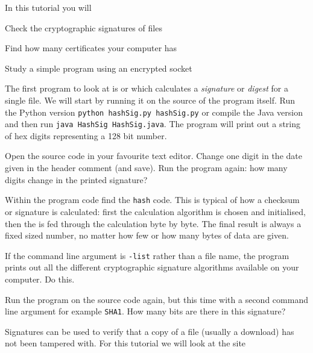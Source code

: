 









In this tutorial you will

\DOT Check the cryptographic signatures of files

\DOT Find how many certificates your computer has

\DOT Study a simple program using an encrypted socket



\STEP The first program to look at is  or 
which calculates a \emph{signature} or \emph{digest} for a single file. We
will start by running it on the source of the program itself. Run the Python
version \texttt{python hashSig.py hashSig.py} or compile the Java version and
then run \texttt{java HashSig HashSig.java}. The program will print out a
string of hex digits representing a 128 bit number.

Open the source code in your favourite text editor. Change one digit in the
 date given in the header comment (and save). Run the program again:
how many digits change in the printed signature?

Within the program code find the \texttt{hash} code. This is typical of how a
checksum or signature is calculated: first the calculation algorithm is chosen and
initialised, then the  is fed through the calculation byte by byte.
The final result is always a fixed sized number, no matter how few or how
many bytes of data are given.

\STEP If the command line argument is \texttt{-list} rather than a file name,
the program prints out all the different cryptographic signature algorithms
available on your computer. Do this.

Run the program on the source code again, but this time with a second command
line argument for example \texttt{SHA1}. How many bits are there in this signature?

\STEP Signatures can be used to verify that a copy of a file (usually a download)
has not been tampered with. For this tutorial we will look at the site

